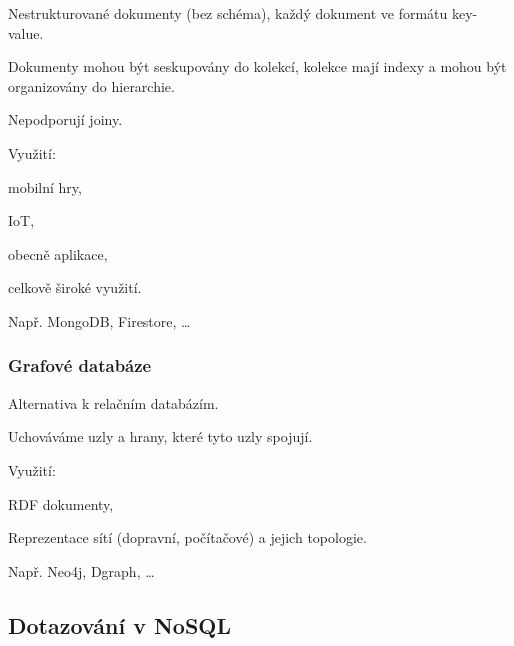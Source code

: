 \begin{compactitem}
    \item Nestrukturované dokumenty (bez schéma), každý dokument ve formátu key-value.
    \item Dokumenty mohou být seskupovány do kolekcí, kolekce mají indexy a mohou být organizovány do hierarchie.
    \item Nepodporují joiny.
    \item Využití: \begin{compactitem}
        \item mobilní hry,
        \item IoT,
        \item obecně aplikace,
        \item celkově široké využití.
    \end{compactitem}
    \item Např. MongoDB, Firestore, \dots
\end{compactitem}


\subsubsection*{Grafové databáze}

\begin{compactitem}
    \item Alternativa k relačním databázím.
    \item Uchováváme uzly a hrany, které tyto uzly spojují.
    \item Využití: \begin{compactitem}
        \item RDF dokumenty,
        \item Reprezentace sítí (dopravní, počítačové) a jejich topologie.
    \end{compactitem}
    \item Např. Neo4j, Dgraph, \dots
\end{compactitem}

\subsection{Dotazování v NoSQL}

